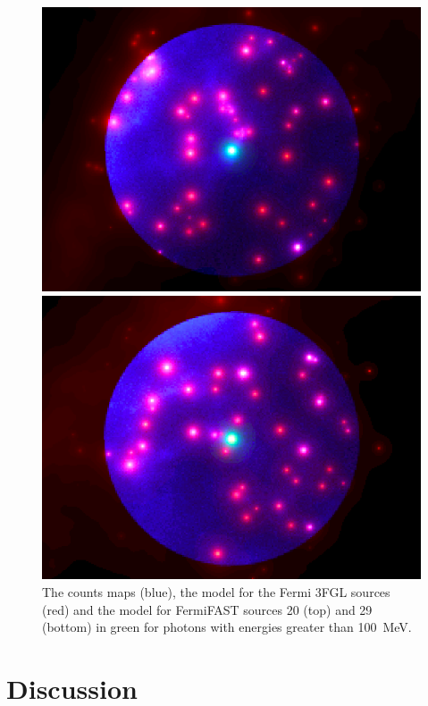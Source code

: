 \documentclass[useAMS,usenatbib]{mn2e}
\begin{document}
\begin{figure}
  \includegraphics[width=\columnwidth]{src_20_combo}
  
  \includegraphics[width=\columnwidth]{src_29_combo}
  \caption{The counts maps (blue), the model for the Fermi 3FGL
    sources (red) and the model for FermiFAST sources 20 (top) and 29
    (bottom) in green for photons with energies greater than 100~MeV.}
  \label{fig:100MeVcmap}
\end{figure}


\section{Discussion}
\label{sec:discussion}
\end{document}
